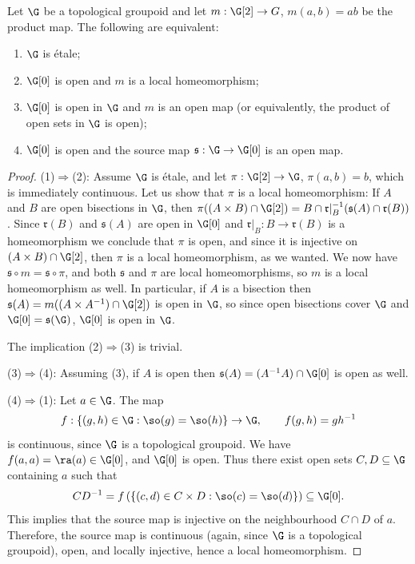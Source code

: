 \begin{theorem}[{\cite[Theorem~5.18]{MR2304314}}]\label{theoremequivalenceetale}
Let $\G$ be a topological groupoid and let $m:\G[2]\to G$, $m(a,b)=ab$ be the product map. The following are equivalent:
\begin{enumerate}
\item[(1)] $\G$ is étale;
\item[(2)] $\G[0]$ is open and $m$ is a local homeomorphism;
\item[(3)] $\G[0]$ is open in $\G$ and $m$ is an open map (or equivalently, the product of open sets in $\G$ is open);
\item[(4)] $\G[0]$ is open and the source map $\mathfrak{s}:\G\to\G[0]$ is an open map.
\end{enumerate}
\end{theorem}
\begin{proof}
(1)$\Rightarrow$(2): Assume $\G$ is étale, and let $\pi:\G[2]\to\G$, $\pi(a,b)=b$, which is immediately continuous. Let us show that $\pi$ is a local homeomorphism: If $A$ and $B$ are open bisections in $\G$, then $\pi((A\times B)\cap\G[2])=B\cap\mathfrak{r}|_B^{-1}(\mathfrak{s}(A)\cap \mathfrak{r}(B))$. Since $\mathfrak{r}(B)$ and $\mathfrak{s}(A)$ are open in $\G[0]$ and $\mathfrak{r}|_B:B\to\mathfrak{r}(B)$ is a homeomorphism we conclude that $\pi$ is open, and since it is injective on $(A\times B)\cap\G[2]$, then $\pi$ is a local homeomorphism, as we wanted. We now have $\mathfrak{s}\circ m=\mathfrak{s}\circ\pi$, and both $\mathfrak{s}$ and $\pi$ are local homeomorphisms, so $m$ is a local homeomorphism as well. In particular, if $A$ is a bisection then $\mathfrak{s}(A)=m((A\times A^{-1})\cap \G[2])$ is open in $\G$, so since open bisections cover $\G$ and $\G[0]=\mathfrak{s}(\G)$, $\G[0]$ is open in $\G$.

The implication (2)$\Rightarrow$(3) is trivial.

(3)$\Rightarrow$(4): Assuming (3), if $A$ is open then $\mathfrak{s}(A)=(A^{-1}A)\cap \G[0]$ is open as well.

(4)$\Rightarrow$(1): Let $a\in\G$. The map
\[f:\left\{(g,h)\in\G:\so(g)=\so(h)\right\}\to\G,\qquad f(g,h)=gh^{-1}\]
is continuous, since $\G$ is a topological groupoid. We have $f(a,a)=\ra(a)\in\G[0]$, and $\G[0]$ is open. Thus there exist open sets $C,D\subseteq\G$ containing $a$ such that 
\[CD^{-1}=f\left(\left\{(c,d)\in C\times D:\so(c)=\so(d)\right\}\right)\subseteq\G[0].\]
This implies that the source map is injective on the neighbourhood $C\cap D$ of $a$. Therefore, the source map is continuous (again, since $\G$ is a topological groupoid), open, and locally injective, hence a local homeomorphism.\qedhere
\end{proof}

